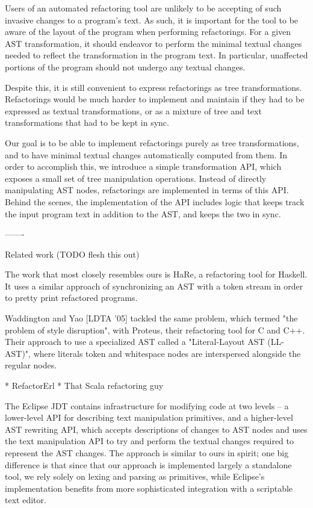 Users of an automated refactoring tool are unlikely to be accepting of such
invasive changes to a program's text. As such, it is important for the tool to
be aware of the layout of the program when performing refactorings. For a given
AST transformation, it should endeavor to perform the minimal textual changes
needed to reflect the transformation in the program text. In particular,
unaffected portions of the program should not undergo any textual changes.

Despite this, it is still convenient to express refactorings as tree
transformations. Refactorings would be much harder to implement and maintain if
they had to be expressed as textual transformations, or as a mixture of tree
and text transformations that had to be kept in sync.

Our goal is to be able to implement refactorings purely as tree
transformations, and to have minimal textual changes automatically computed
from them. In order to accomplish this, we introduce a simple transformation
API, which exposes a small set of tree manipulation operations. Instead of
directly manipulating AST nodes, refactorings are implemented in terms of this
API. Behind the scenes, the implementation of the API includes logic that keeps
track the input program text in addition to the AST, and keeps the two in sync.

-------

Related work (TODO flesh this out)

The work that most closely resembles ours is HaRe, a refactoring tool for
Haskell.  It uses a similar approach of synchronizing an AST with a token
stream in order to pretty print refactored programs.

Waddington and Yao [LDTA '05] tackled the same problem, which termed "the
problem of style disruption", with Proteus, their refactoring tool for C and
C++. Their approach to use a specialized AST called a "Literal-Layout AST
(LL-AST)", where literals token and whitespace nodes are interspersed alongside
the regular nodes.

* RefactorErl * That Scala refactoring guy

The Eclipse JDT contains infrastructure for modifying code at two levels -- a
lower-level API for describing text manipulation primitives, and a higher-level
AST rewriting API, which accepts descriptions of changes to AST nodes and uses
the text manipulation API to try and perform the textual changes required to
represent the AST changes. The approach is similar to ours in spirit; one big
difference is that since that our approach is implemented largely a standalone
tool, we rely solely on lexing and parsing as primitives, while Eclipse's
implementation benefits from more sophisticated integration with a scriptable
text editor.
